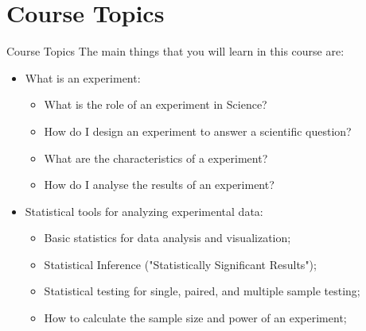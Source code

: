 \documentclass[aspectratio=169]{beamer}
\begin{document}



\section{Course Topics}
\begin{frame}{Course Topics}
  The main things that you will learn in this course are:\bigskip

  \begin{itemize}
    \item What is an experiment:
    \begin{itemize}
      \item What is the role of an experiment in Science?
      \item How do I design an experiment to answer a scientific question?
      \item What are the characteristics of a  experiment?
      \item How do I analyse the results of an experiment?
    \end{itemize}\bigskip

    \item Statistical tools for analyzing experimental data:
    \begin{itemize}
      \item Basic statistics for data analysis and visualization;
      \item Statistical Inference ("Statistically Significant Results");
      \item Statistical testing for single, paired, and multiple sample testing;
      \item How to calculate the sample size and power of an experiment;
    \end{itemize}
  \end{itemize}
\end{frame}
\end{document}
